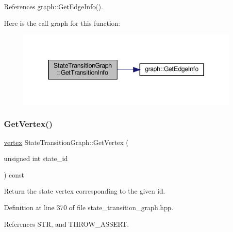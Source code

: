 References graph\+::\+Get\+Edge\+Info().

Here is the call graph for this function\+:
\nopagebreak
\begin{figure}[H]
\begin{center}
\leavevmode
\includegraphics[width=326pt]{d9/d86/structStateTransitionGraph_a5c3eccee5a4b0b87a416a8829f7a96d7_cgraph}
\end{center}
\end{figure}
\mbox{\label{structStateTransitionGraph_ac5686f613542a80be95c0a5bc888216d}} 
\subsubsection{\texorpdfstring{Get\+Vertex()}{GetVertex()}}
{\footnotesize\ttfamily \hyperlink{graph_8hpp_abefdcf0544e601805af44eca032cca14}{vertex} State\+Transition\+Graph\+::\+Get\+Vertex (\begin{DoxyParamCaption}\item[{unsigned int}]{state\+\_\+id }\end{DoxyParamCaption}) const\hspace{0.3cm}{\ttfamily [inline]}}



Return the state vertex corresponding to the given id. 



Definition at line 370 of file state\+\_\+transition\+\_\+graph.\+hpp.



References S\+TR, and T\+H\+R\+O\+W\+\_\+\+A\+S\+S\+E\+RT.

\mbox{\label{structStateTransitionGraph_af5933c5e1580fc618df655dd2c0078e2}} 
